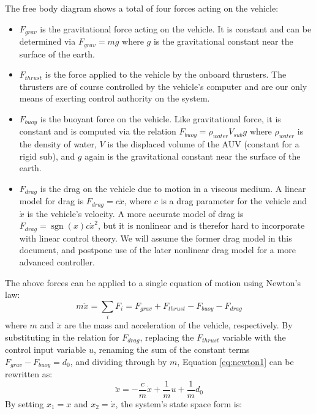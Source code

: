 \documentclass{article}
\begin{document}
The free body diagram shows a total of four forces acting on the vehicle: 
\begin{itemize}
\item $F_{grav}$ is the gravitational force acting on the vehicle.  It is constant and can be determined via $F_{grav}=mg$ where $g$ is the gravitational constant near the surface of the earth.
\item $F_{thrust}$ is the force applied to the vehicle by the onboard thrusters.  The thrusters are of course controlled by the vehicle's computer and are our only means of exerting control authority on the system.
\item $F_{buoy}$ is the buoyant force on the vehicle.  Like gravitational force, it is constant and is computed via the relation $F_{buoy}=\rho_{water}V_{sub}g$ where $\rho_{water}$ is the density of water, $V$ is the displaced volume of the AUV (constant for a rigid sub), and $g$ again is the gravitational constant near the surface of the earth.
\item $F_{drag}$ is the drag on the vehicle due to motion in a viscous medium.  A linear model for drag is $F_{drag}=c\dot{x}$, where $c$ is a drag parameter for the vehicle and $\dot{x}$ is the vehicle's velocity.  A more accurate model of drag is $F_{drag}=\operatorname{sgn}(x)c\dot{x}^{2}$, but it is nonlinear and is therefor hard to incorporate with linear control theory.  We will assume the former drag model in this document, and postpone use of the later nonlinear drag model for a more advanced controller.
\end{itemize}
The above forces can be applied to a single equation of motion using Newton's law:  
\begin{equation}
\label{eq:newton1}
m\ddot{x}=\sum_{i}F_i=F_{grav}+F_{thrust}-F_{buoy}-F_{drag}
\end{equation}
where $m$ and $\ddot{x}$ are the mass and acceleration of the vehicle, respectively.  By substituting in the relation for $F_{drag}$, replacing the $F_{thrust}$ variable with the control input variable $u$, renaming the sum of the constant terms $F_{grav}-F_{buoy}=d_0$, and dividing through by $m$, Equation \ref{eq:newton1} can be rewritten as:
\begin{equation}
\ddot{x}=-\frac{c}{m}\dot{x}+\frac{1}{m}u+\frac{1}{m}d_0
\end{equation}
By setting $x_1=x$ and $x_2=\dot{x}$, the system's state space form is:
\end{document}
